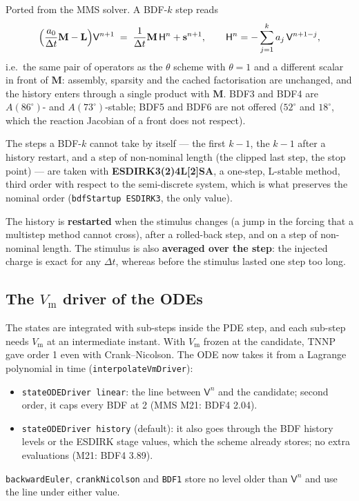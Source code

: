 \documentclass[11pt,a4paper]{article}
\newcommand{\code}[1]{\texttt{\small #1}}
\newcommand{\Vm}{V_{\text{m}}}
\newcommand{\Mmass}{\mathbf{M}}
\newcommand{\Lop}{\mathbf{L}}
\begin{document}
Ported from the MMS solver. A BDF-$k$ step reads
\begin{equation}
  \Bigl(\frac{a_0}{\Delta t}\Mmass - \Lop\Bigr)\mathsf{V}^{n+1}
  \;=\; \frac{1}{\Delta t}\Mmass\,\mathsf{H}^{n} + \mathbf{s}^{n+1},
  \qquad
  \mathsf{H}^{n} = -\sum_{j=1}^{k} a_j\,\mathsf{V}^{n+1-j},
\end{equation}
i.e.\ the same pair of operators as the $\theta$ scheme with $\theta=1$ and a
different scalar in front of $\Mmass$: assembly, sparsity and the cached
factorisation are unchanged, and the history enters through a single product with
$\Mmass$. BDF3 and BDF4 are $A(86^\circ)$- and $A(73^\circ)$-stable; BDF5 and BDF6
are not offered ($52^\circ$ and $18^\circ$, which the reaction Jacobian of a front
does not respect).

The steps a BDF-$k$ cannot take by itself --- the first $k-1$, the $k-1$ after a
history restart, and a step of non-nominal length (the clipped last step, the stop
point) --- are taken with \textbf{ESDIRK3(2)4L[2]SA}, a one-step, L-stable method,
third order with respect to the semi-discrete system, which is what preserves the
nominal order (\code{bdfStartup ESDIRK3}, the only value).

The history is \textbf{restarted} when the stimulus changes (a jump in the forcing
that a multistep method cannot cross), after a rolled-back step, and on a step of
non-nominal length. The stimulus is also \textbf{averaged over the step}: the
injected charge is exact for any $\Delta t$, whereas before the stimulus lasted one
step too long.

\subsection{The \texorpdfstring{$\Vm$}{Vm} driver of the ODEs}
\label{sec:oct-driver}

The states are integrated with sub-steps inside the PDE step, and each sub-step
needs $\Vm$ at an intermediate instant. With $\Vm$ frozen at the candidate, TNNP
gave order 1 even with Crank--Nicolson. The ODE now takes it from a Lagrange
polynomial in time (\code{interpolateVmDriver}):
\begin{itemize}[nosep]
  \item \code{stateODEDriver linear}: the line between $\mathsf{V}^{n}$ and the
        candidate; second order, it caps every BDF at 2 (MMS M21: BDF4 2.04).
  \item \code{stateODEDriver history} (default): it also goes through the BDF
        history levels or the ESDIRK stage values, which the scheme already
        stores; no extra evaluations (M21: BDF4 3.89).
\end{itemize}
\code{backwardEuler}, \code{crankNicolson} and \code{BDF1} store no level older
than $\mathsf{V}^n$ and use the line under either value.
\end{document}
